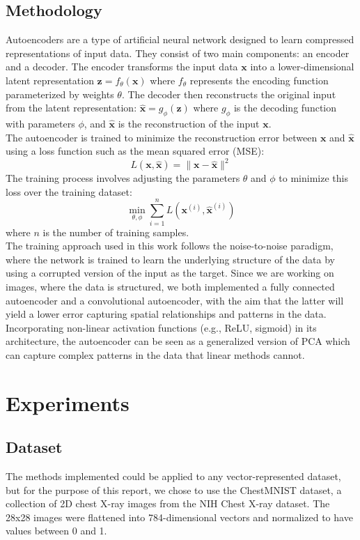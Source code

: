 \documentclass[10pt,conference,compsocconf]{IEEEtran}
\begin{document}
\subsection*{Methodology}
Autoencoders are a type of artificial neural network designed to learn compressed representations 
of input data. They consist of two main components: an encoder and a decoder. The encoder transforms 
the input data $\mathbf{x}$ into a lower-dimensional latent representation $\mathbf{z} = f_\theta(\mathbf{x})$
where $f_\theta$ represents the encoding function parameterized by weights $\theta$. The decoder then
reconstructs the original input from the latent representation: $\hat{\mathbf{x}} = g_\phi(\mathbf{z})$
where $g_\phi$ is the decoding function with parameters $\phi$, and $\hat{\mathbf{x}}$ is the 
reconstruction of the input $\mathbf{x}$. \\
The autoencoder is trained to minimize the reconstruction error between $\mathbf{x}$ and 
$\hat{\mathbf{x}}$ using a loss function such as the mean squared error (MSE):
\[
L(\mathbf{x}, \hat{\mathbf{x}}) = \|\mathbf{x} - \hat{\mathbf{x}}\|^2
\]
The training process involves adjusting the parameters $\theta$ and $\phi$ to minimize this loss over 
the training dataset:
\[
\min_{\theta, \phi} \sum_{i=1}^{n} L\left(\mathbf{x}^{(i)}, \hat{\mathbf{x}}^{(i)}\right)
\]
where $n$ is the number of training samples. \\
The training approach used in this work follows the noise-to-noise paradigm, where the network is trained to learn the underlying structure of the data by using a corrupted version of the input as the target.
Since we are working on images, where the data is structured, we both implemented a fully connected autoencoder and a convolutional autoencoder, with the aim that the latter will yield a lower error capturing spatial relationships and patterns in the data.
Incorporating non-linear activation functions (e.g., ReLU, sigmoid) in its architecture, the autoencoder can be seen as a generalized version of PCA which can capture complex patterns in the data that linear methods cannot.


\section{Experiments}
\subsection*{Dataset}
The methods implemented could be applied to any vector-represented dataset, but for the purpose of this report,
we chose to use the ChestMNIST dataset, a collection of 2D chest X-ray images from the NIH Chest X-ray
dataset. The 28x28 images were flattened into 784-dimensional vectors and normalized to have values
between 0 and 1. 
\end{document}
